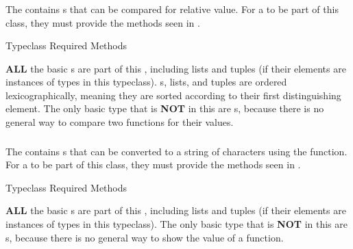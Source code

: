 \subsubsection{\texorpdfstring{}{\texttt{Ord}}}\label{subsubsec:Ord_Typeclass}
The   contains s that can be compared for relative value.
For a  to be part of this class, they must provide the methods seen in .

\begin{listing}[h!tbp]
\caption{ Typeclass Required Methods}
\label{lst:Ord_Typeclass_Methods}
\end{listing}

\textbf{ALL} the basic s are part of this , including lists and tuples (if their elements are instances of types in this typeclass).
s, lists, and tuples are ordered lexicographically, meaning they are sorted according to their first distinguishing element.
The only basic type that is \textbf{NOT} in this  are s, because there is no general way to compare two functions for their values.

\subsubsection{\texorpdfstring{}{\texttt{Show}}}\label{subsubsec:Show_Typeclass}
The   contains s that can be converted to a string of characters using the  function.
For a  to be part of this class, they must provide the methods seen in .

\begin{listing}[h!tbp]
\caption{ Typeclass Required Methods}
\label{lst:Show_Typeclass_Methods}
\end{listing}

\textbf{ALL} the basic s are part of this , including lists and tuples (if their elements are instances of types in this typeclass).
The only basic type that is \textbf{NOT} in this  are s, because there is no general way to show the value of a function.

